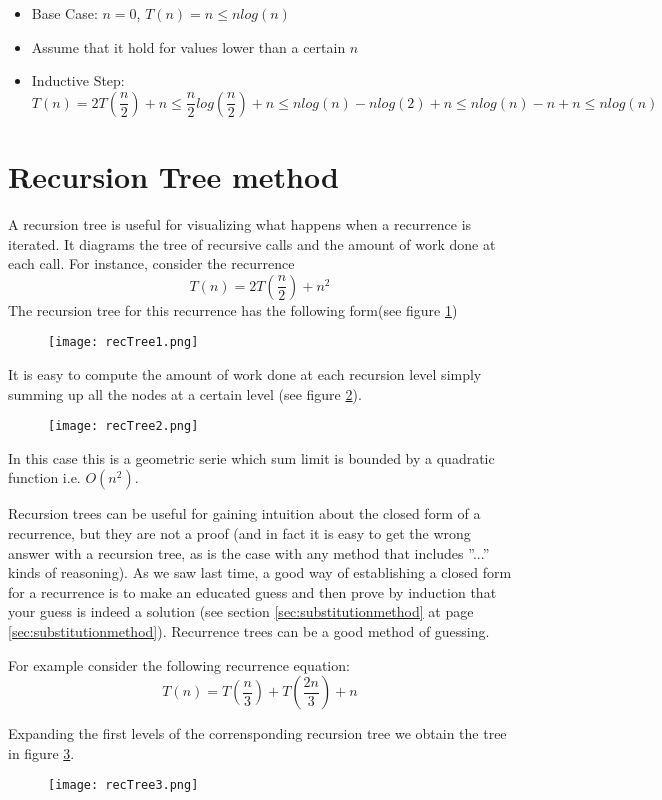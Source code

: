 \begin{itemize}
\item Base Case: $n=0$, $T(n) = n \leq nlog(n)$
\item Assume that it hold for values lower than a certain $n$
\item Inductive Step: 
\[T(n) = 2T(\frac{n}{2}) + n \leq \frac{n}{2} log(\frac{n}{2}) + n \leq nlog(n) - nlog(2) +n \leq nlog(n) - n +n \leq nlog(n)\]
\end{itemize}




\section{Recursion Tree method}
A recursion tree is useful for visualizing what happens when a recurrence is iterated. It diagrams the tree of recursive calls and the amount of work done at each call.
For instance, consider the recurrence
\[T(n) = 2T(\frac{n}{2}) + n^2\]
The recursion tree for this recurrence has the following form(see figure \ref{fig:rectree1})

\begin{figure}
\label{fig:rectree1}
		\texttt{[image: recTree1.png]}
\end{figure}
It is easy to compute the amount of work done at each recursion level simply summing up all the nodes at a certain level (see figure \ref{fig:rectree2}).
\begin{figure}
\label{fig:rectree2}
		\texttt{[image: recTree2.png]}
\end{figure}

In this case this is a geometric serie which sum limit is bounded by a quadratic function i.e. $O(n^2)$. 

Recursion trees can be useful for gaining intuition about the closed form of a recurrence, but they are not a proof (and in fact it is easy to get the wrong answer with a recursion tree, as is the case with any method that includes ''...'' kinds of reasoning). As we saw last time, a good way of establishing a closed form for a recurrence is to make an educated guess and then prove by induction that your guess is indeed a solution (see section \ref{sec:substitutionmethod} at page \ref{sec:substitutionmethod}). Recurrence trees can be a good method of guessing.


For example consider the following recurrence equation:
\[ T(n) = T(\frac{n}{3}) + T(\frac{2n}{3}) + n\]

Expanding the first levels of the corrensponding recursion tree we obtain the tree in figure \ref{fig:rectree3}.
\begin{figure}
\label{fig:rectree3}
		\texttt{[image: recTree3.png]}
\end{figure}

